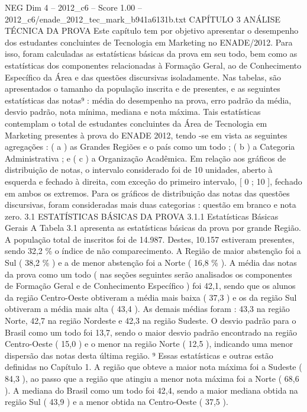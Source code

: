 \begin{textsample}{NEG Dim 4 – 2012\_c6 – Score 1.00 – 2012\_c6/enade\_2012\_tec\_mark\_b941a6131b.txt}  \label{ex:f4_neg_229}
CAPÍTULO 3 ANÁLISE TÉCNICA DA PROVA Este capítulo tem por objetivo apresentar o desempenho dos estudantes concluintes de Tecnologia em Marketing no ENADE/2012.
Para isso, foram calculadas as estatísticas básicas da prova em seu todo, bem como as estatísticas dos componentes relacionadas à Formação Geral, ao de Conhecimento Específico da Área e das questões discursivas isoladamente.
Nas tabelas, são apresentados o tamanho da população inscrita e de presentes, e as seguintes estatísticas das notas⁹ : média do desempenho na prova, erro padrão da média, desvio padrão, nota mínima, mediana e nota máxima.
Tais estatísticas contemplam o total de estudantes concluintes da Área de Tecnologia em Marketing presentes à prova do ENADE 2012, tendo -se em vista as seguintes agregações : ( a ) as Grandes Regiões e o país como um todo ; ( b ) a Categoria Administrativa ; e ( c ) a Organização Acadêmica.
Em relação aos gráficos de distribuição de notas, o intervalo considerado foi de 10 unidades, aberto à esquerda e fechado à direita, com exceção do primeiro intervalo, [ 0 ; 10 ], fechado em ambos os extremos.
Para os gráficos de distribuição das notas das questões discursivas, foram consideradas mais duas categorias : questão em branco e nota zero. 3.1 ESTATÍSTICAS BÁSICAS DA PROVA 3.1.1 Estatísticas Básicas Gerais A Tabela 3.1 apresenta as estatísticas básicas da prova por grande Região.
A população total de inscritos foi de 14.987.
Destes, 10.157 estiveram presentes, sendo 32,2 \% o índice de não comparecimento.
A Região de maior abstenção foi a Sul ( 38,2 \% ) e a de menor abstenção foi a Norte ( 16,8 \% ).
A média das notas da prova como um todo ( nas seções seguintes serão analisados os componentes de Formação Geral e de Conhecimento Específico ) foi 42,1, sendo que os alunos da região Centro-Oeste obtiveram a média mais baixa ( 37,3 ) e os da região Sul obtiveram a média mais alta ( 43,4 ).
As demais médias foram : 43,3 na região Norte, 42,7 na região Nordeste e 42,3 na região Sudeste.
O desvio padrão para o Brasil como um todo foi 13,7, sendo o maior desvio padrão encontrado na região Centro-Oeste ( 15,0 ) e o menor na região Norte ( 12,5 ), indicando uma menor dispersão das notas desta última região. ⁹ Essas estatísticas e outras estão definidas no Capítulo 1.
A região que obteve a maior nota máxima foi a Sudeste ( 84,3 ), ao passo que a região que atingiu a menor nota máxima foi a Norte ( 68,6 ).
A mediana do Brasil como um todo foi 42,4, sendo a maior mediana obtida na região Sul ( 43,9 ) e a menor obtida na Centro-Oeste ( 37,5 ).

\end{textsample}
